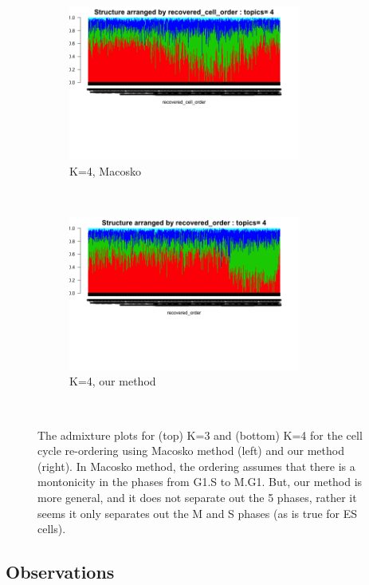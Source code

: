 \documentclass[11pt]{article}
\begin{document}
\begin{figure}[ht]
     \begin{subfigure}[t]{0.5\textwidth}
        \centering
        \includegraphics[height=2in]{../figures/ipsc_structure_batchcorrect_cellcycle/clus_4/struct_clus_4_recovered_cell_order.png}
        \caption{K=4, Macosko}
    \end{subfigure}%
    ~
    \begin{subfigure}[t]{0.5\textwidth}
        \centering
        \includegraphics[height=2in]{../figures/ipsc_structure_batchcorrect_cellcycle/clus_4/struct_clus_4_recovered_order.png}
        \caption{K=4, our method}
    \end{subfigure}\\
  \caption{The admixture plots for (top) K=3 and (bottom) K=4 for the cell cycle re-ordering using Macosko method (left) and our method (right). In Macosko method, the ordering assumes that there is a montonicity in the phases from G1.S to M.G1. But, our method is more general, and it does not separate out the 5 phases, rather it seems it only separates out the M and S phases (as is true for ES cells).}
 \label{fig:fig5}
 \end{figure}   

\subsection{Observations}
\end{document}

